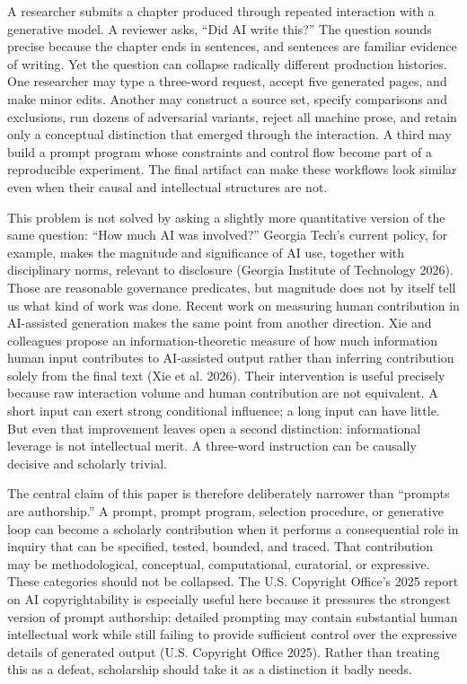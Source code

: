 \documentclass[
]{article}
\begin{document}
A researcher submits a chapter produced through repeated interaction
with a generative model. A reviewer asks, ``Did AI write this?'' The
question sounds precise because the chapter ends in sentences, and
sentences are familiar evidence of writing. Yet the question can
collapse radically different production histories. One researcher may
type a three-word request, accept five generated pages, and make minor
edits. Another may construct a source set, specify comparisons and
exclusions, run dozens of adversarial variants, reject all machine
prose, and retain only a conceptual distinction that emerged through the
interaction. A third may build a prompt program whose constraints and
control flow become part of a reproducible experiment. The final
artifact can make these workflows look similar even when their causal
and intellectual structures are not.

This problem is not solved by asking a slightly more quantitative
version of the same question: ``How much AI was involved?'' Georgia
Tech's current policy, for example, makes the magnitude and significance
of AI use, together with disciplinary norms, relevant to disclosure
(Georgia Institute of Technology 2026). Those are reasonable governance
predicates, but magnitude does not by itself tell us what kind of work
was done. Recent work on measuring human contribution in AI-assisted
generation makes the same point from another direction. Xie and
colleagues propose an information-theoretic measure of how much
information human input contributes to AI-assisted output rather than
inferring contribution solely from the final text (Xie et al. 2026).
Their intervention is useful precisely because raw interaction volume
and human contribution are not equivalent. A short input can exert
strong conditional influence; a long input can have little. But even
that improvement leaves open a second distinction: informational
leverage is not intellectual merit. A three-word instruction can be
causally decisive and scholarly trivial.

The central claim of this paper is therefore deliberately narrower than
``prompts are authorship.'' A prompt, prompt program, selection
procedure, or generative loop can become a scholarly contribution when
it performs a consequential role in inquiry that can be specified,
tested, bounded, and traced. That contribution may be methodological,
conceptual, computational, curatorial, or expressive. These categories
should not be collapsed. The U.S. Copyright Office's 2025 report on AI
copyrightability is especially useful here because it pressures the
strongest version of prompt authorship: detailed prompting may contain
substantial human intellectual work while still failing to provide
sufficient control over the expressive details of generated output (U.S.
Copyright Office 2025). Rather than treating this as a defeat,
scholarship should take it as a distinction it badly needs.
\end{document}
